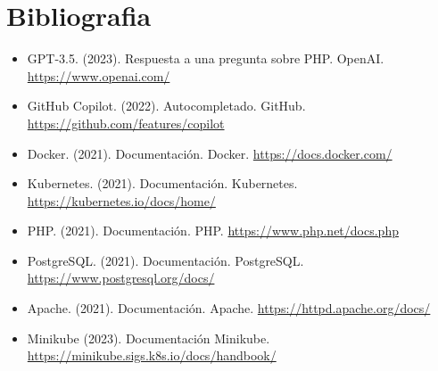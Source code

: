 \documentclass{report}
\begin{document}
    \chapter{Bibliografia}
        \begin{itemize}
            \item GPT-3.5. (2023). Respuesta a una pregunta sobre PHP. OpenAI. \url{https://www.openai.com/}
            \item GitHub Copilot. (2022). Autocompletado. GitHub. \url{https://github.com/features/copilot}
            \item Docker. (2021). Documentación. Docker. \url{https://docs.docker.com/}
            \item Kubernetes. (2021). Documentación. Kubernetes. \url{https://kubernetes.io/docs/home/}
            \item PHP. (2021). Documentación. PHP. \url{https://www.php.net/docs.php}
            \item PostgreSQL. (2021). Documentación. PostgreSQL. \url{https://www.postgresql.org/docs/}
            \item Apache. (2021). Documentación. Apache. \url{https://httpd.apache.org/docs/}
            \item Minikube (2023). Documentación Minikube. \url{https://minikube.sigs.k8s.io/docs/handbook/}
        \end{itemize}
\end{document}
